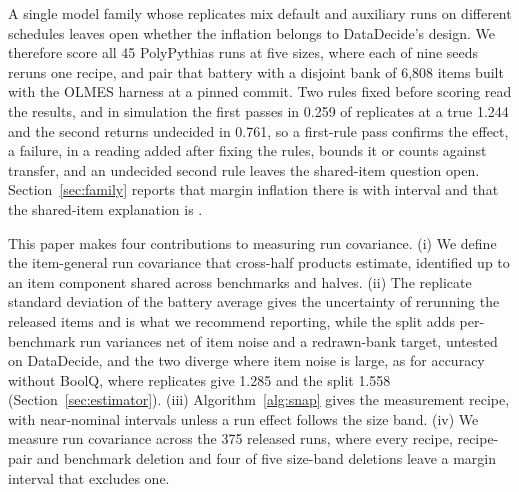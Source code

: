 A single model family whose replicates mix default and auxiliary runs on different schedules leaves open whether the inflation belongs to DataDecide's design. We therefore score all 45 PolyPythias runs at five sizes, where each of nine seeds reruns one recipe, and pair that battery with a disjoint bank of 6,808 items built with the OLMES harness \citep{gu2025olmes} at a pinned commit. Two rules fixed before scoring read the results, and in simulation the first passes in 0.259 of replicates at a true 1.244 and the second returns undecided in 0.761, so a first-rule pass confirms the effect, a failure, in a reading added after fixing the rules, bounds it or counts against transfer, and an undecided second rule leaves the shared-item question open. Section~\ref{sec:family} reports that margin inflation there is  with interval  and that the shared-item explanation is .

This paper makes four contributions to measuring run covariance. (i) We define the item-general run covariance that cross-half products estimate, identified up to an item component shared across benchmarks and halves. (ii) The replicate standard deviation of the battery average gives the uncertainty of rerunning the released items and is what we recommend reporting, while the split adds per-benchmark run variances net of item noise and a redrawn-bank target, untested on DataDecide, and the two diverge where item noise is large, as for accuracy without BoolQ, where replicates give 1.285 and the split 1.558 (Section~\ref{sec:estimator}). (iii) Algorithm~\ref{alg:snap} gives the measurement recipe, with near-nominal intervals unless a run effect follows the size band. (iv) We measure run covariance across the 375 released runs, where every recipe, recipe-pair and benchmark deletion and four of five size-band deletions leave a margin interval that excludes one.
